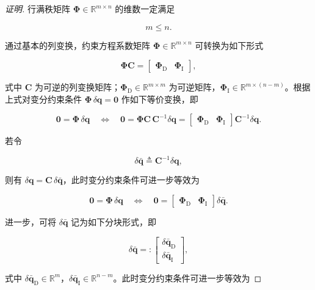 \begin{proof}[证明]
行满秩矩阵 $\boldsymbol{\Phi}\in\mathbb{R}^{m\times n}$ 的维数一定满足

\[
m\leq n.
\]

通过基本的列变换，约束方程系数矩阵 $\boldsymbol{\Phi}\in\mathbb{R}^{m\times n}$ 可转换为如下形式

\[
\boldsymbol{\Phi}\boldsymbol{C}=\begin{bmatrix}\boldsymbol{\Phi}_{\mathrm{D}}&\boldsymbol{\Phi}_{\mathrm{I}}\end{bmatrix},
\]

式中 $\boldsymbol{C}$ 为可逆的列变换矩阵；$\boldsymbol{\Phi}_{\mathrm{D}}\in\mathbb{R}^{m\times m}$ 为可逆矩阵，$\boldsymbol{\Phi}_{\mathrm{I}}\in\mathbb{R}^{m\times(n-m)}$。根据上式对变分约束条件 $\boldsymbol{\Phi}\,\delta\boldsymbol{q}=\boldsymbol{0}$ 作如下等价变换，即

\[
\boldsymbol{0}=\boldsymbol{\Phi}\,\delta\boldsymbol{q}\quad\Leftrightarrow\quad\boldsymbol{0}=\boldsymbol{\Phi}\boldsymbol{C}\,\boldsymbol{C}^{-1}\delta\boldsymbol{q}=\begin{bmatrix}\boldsymbol{\Phi}_{\mathrm{D}}&\boldsymbol{\Phi}_{\mathrm{I}}\end{bmatrix}\boldsymbol{C}^{-1}\delta\boldsymbol{q}.
\]

若令

\[
\delta\bar{\boldsymbol{q}}\triangleq\boldsymbol{C}^{-1}\delta\boldsymbol{q},
\]

则有 $\delta\boldsymbol{q}=\boldsymbol{C}\,\delta\bar{\boldsymbol{q}}$，此时变分约束条件可进一步等效为

\[
\boldsymbol{0}=\boldsymbol{\Phi}\,\delta\boldsymbol{q}\quad\Leftrightarrow\quad\boldsymbol{0}=\begin{bmatrix}\boldsymbol{\Phi}_{\mathrm{D}}&\boldsymbol{\Phi}_{\mathrm{I}}\end{bmatrix}\delta\bar{\boldsymbol{q}}.
\]

进一步，可将 $\delta\bar{\boldsymbol{q}}$ 记为如下分块形式，即

\[
\delta\bar{\boldsymbol{q}}=:\begin{bmatrix}\delta\bar{\boldsymbol{q}}_{\mathrm{D}}\\\delta\bar{\boldsymbol{q}}_{\mathrm{I}}\end{bmatrix},
\]

式中 $\delta\bar{\boldsymbol{q}}_{\mathrm{D}}\in\mathbb{R}^m$，$\delta\bar{\boldsymbol{q}}_{\mathrm{I}}\in\mathbb{R}^{n-m}$。此时变分约束条件可进一步等效为


\end{proof}

